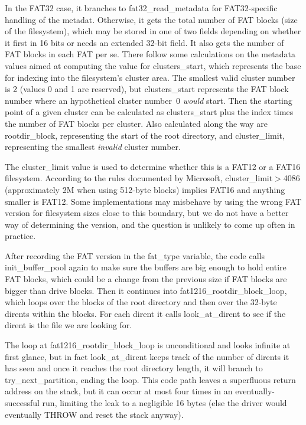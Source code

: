 In the FAT32 case, it branches to fat32\_read\_metadata for FAT32-specific
handling of the metadat.  Otherwise, it gets the total number of FAT blocks
(size of the filesystem), which may be stored in one of two fields depending
on whether it first in 16 bits or needs an extended 32-bit field.  It also
gets the number of FAT blocks in each FAT per se.  There follow some
calculations on the metadata values aimed at computing the value for
clusters\_start, which represents the base for indexing into the
filesystem's cluster area.  The smallest valid cluster number is 2 (values 0
and 1 are reserved), but clusters\_start represents the FAT block number
where an hypothetical cluster number~0 \emph{would} start.  Then the
starting point of a given cluster can be calculated as clusters\_start plus
the index times the number of FAT blocks per cluster.  Also calculated along
the way are rootdir\_block, representing the start of the root directory,
and cluster\_limit, representing the smallest \emph{invalid} cluster number.

The cluster\_limit value is used to determine whether this is a FAT12 or a
FAT16 filesystem.  According to the rules documented by Microsoft,
cluster\_limit$>$4086 (approximately 2M when using 512-byte blocks) implies
FAT16 and anything smaller is FAT12.  Some implementations may misbehave by
using the wrong FAT version for filesystem sizes close to this boundary, but
we do not have a better way of determining the version, and the question is
unlikely to come up often in practice.

After recording the FAT version in the fat\_type variable, the code calls
init\_buffer\_pool again to make sure the buffers are big enough to hold
entire FAT blocks, which could be a change from the previous size if FAT
blocks are bigger than drive blocks.  Then it continues into
fat1216\_rootdir\_block\_loop, which loops over the blocks of the root
directory and then over the 32-byte dirents within the blocks.  For each
dirent it calls look\_at\_dirent to see if the dirent is the file we are
looking for.

The loop at fat1216\_rootdir\_block\_loop is unconditional and looks
infinite at first glance, but in fact look\_at\_dirent keeps track of the
number of dirents it has seen and once it reaches the root directory length,
it will branch to try\_next\_partition, ending the loop.  This code path
leaves a superfluous return address on the stack, but it can occur at most
four times in an eventually-successful run, limiting the leak to a
negligible 16 bytes (else the driver would eventually THROW and reset the
stack anyway).

